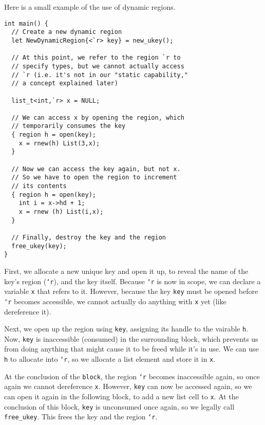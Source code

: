 Here is a small example of the use of dynamic regions.
\begin{verbatim}
int main() {
  // Create a new dynamic region
  let NewDynamicRegion{<`r> key} = new_ukey();

  // At this point, we refer to the region `r to
  // specify types, but we cannot actually access
  // `r (i.e. it's not in our "static capability,"
  // a concept explained later)

  list_t<int,`r> x = NULL;

  // We can access x by opening the region, which
  // temporarily consumes the key
  { region h = open(key);
    x = rnew(h) List(3,x);
  }

  // Now we can access the key again, but not x.
  // So we have to open the region to increment
  // its contents
  { region h = open(key);
    int i = x->hd + 1;
    x = rnew (h) List(i,x);
  }

  // Finally, destroy the key and the region
  free_ukey(key);
}
\end{verbatim}
First, we allocate a new unique key and open it up, to reveal the name of
the key's region (\texttt{`r}), and the key itself.  Because \texttt{`r} is
now in scope, we can declare a variable \texttt{x} that refers to it.
However, because the key \texttt{key} must be opened before \texttt{`r}
becomes accessible, we cannot actually do anything with \texttt{x} yet (like
dereference it).

Next, we open up the region using \texttt{key}, assigning its handle to the
vairable \texttt{h}.  Now, \texttt{key} is inaccessible (consumed) in the
surrounding block, which prevents us from doing anything that might cause it
to be freed while it's in use.  We can use \texttt{h} to allocate into
\texttt{`r}, so we allocate a list element and store it in \texttt{x}.

At the conclusion of the \texttt{block}, the region \texttt{`r} becomes
inaccessible again, so once again we cannot dereference \texttt{x}.
However, \texttt{key} can now be accessed again, so we can open it again in
the following block, to add a new list cell to \texttt{x}.  At the
conclusion of this block, \texttt{key} is unconsumed once again, so we
legally call \texttt{free\_ukey}.  This frees the key and the region
\texttt{`r}.

